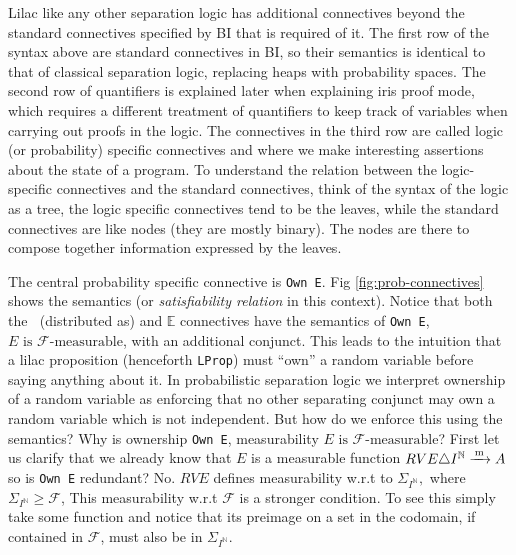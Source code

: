 Lilac like any other separation logic has additional connectives beyond the standard connectives specified by BI that is required of it. The first row of the syntax above are standard connectives in BI,
so their semantics is identical to that of classical separation logic, replacing heaps with probability spaces. The second row of quantifiers is explained later when explaining iris proof mode, which
requires a different treatment of quantifiers to keep track of variables when carrying out proofs in the logic. The connectives in the third row
are called logic (or probability) specific connectives and where we make interesting assertions about the state of a program. To understand the relation between the logic-specific connectives and the standard connectives, think of the syntax of the logic as a tree,
the logic specific connectives tend to be the leaves, while the standard connectives are like nodes (they are mostly binary). The nodes are there to compose together information expressed by the leaves.

The central probability specific connective is \texttt{Own E}. Fig \ref{fig:prob-connectives} shows the semantics (or \emph{satisfiability relation} in this context).
Notice that both the \(~\) (distributed as) and \( \mathbb{E} \) connectives have the semantics of \texttt{Own E}, \( E \text{ is } \mathcal{F}\text{-measurable} \), with an additional conjunct.
This leads to the intuition that a lilac proposition (henceforth \texttt{LProp}) must ``own'' a random variable before saying anything about it. In probabilistic separation logic we interpret ownership
of a random variable as enforcing that no other separating conjunct may own a random variable which is not independent. But how do we enforce this using the semantics? Why is ownership \texttt{Own E},
measurability \( E \text{ is } \mathcal{F}\text{-measurable} \)? First let us clarify that we already know that $E$ is a measurable function $RV E \triangle I^{\mathbb{N}} \xrightarrow{\,\mathrm{m}\,} A$ so is
\texttt{Own E} redundant? No. $RV E$ defines measurability w.r.t to $\Sigma_{I^\mathbb{N}},$ where  $\Sigma_{I^\mathbb{N}} \geq \mathcal{F}$, This measurability w.r.t $\mathcal{F}$ is a stronger condition.
To see this simply take some function and notice that its preimage on a set in the codomain, if contained in $\mathcal{F}$, must also be in $\Sigma_{I^\mathbb{N}}$.

